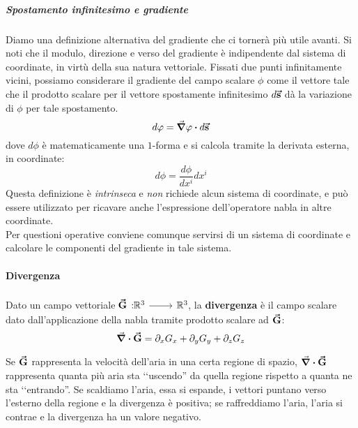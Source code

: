 \subparagraph{Spostamento infinitesimo e gradiente}
Diamo una definizione alternativa del gradiente che ci tornerà più utile avanti. Si noti che il modulo, direzione e verso del gradiente è indipendente dal sistema di coordinate, in virtù della sua natura vettoriale. Fissati due punti infinitamente vicini, possiamo considerare il gradiente del campo scalare $\phi$ come il vettore tale che il prodotto scalare per il vettore spostamente infinitesimo $d\vb*{\va{s}}$ dà la variazione di $\phi$ per tale spostamento.
\begin{equation}
	d\phi=\grad{\phi}\vdot d\vba{s}\label{gradienteintrinseco}
\end{equation}
dove $d\phi$ è matematicamente una $1$-forma e si calcola tramite la derivata esterna, in coordinate:
\begin{equation}
	d\phi=\frac{d\phi}{dx^i}dx^i
\end{equation}
Questa definizione è \textit{intrinseca} e \textit{non} richiede alcun sistema di coordinate, e può essere utilizzato per ricavare anche l'espressione dell'operatore nabla in altre coordinate.\\
Per questioni operative conviene comunque servirsi di un sistema di coordinate e calcolare le componenti del gradiente in tale sistema.
\paragraph{Divergenza}
\begin{define}[Divergenza]
	Dato un campo vettoriale $\funz[\vba{G}]{\realset^3}{\realset^3}$, la \textbf{divergenza} è il campo scalare dato dall'applicazione della nabla tramite prodotto scalare ad $\vb*{\va{G}}$:
	\begin{equation}
		\div{\vb*{\va{G}}}=\partial_xG_x+\partial_yG_y+\partial_zG_z
	\end{equation}
\end{define}
\begin{example}
	Se $\vb*{\va{G}}$ rappresenta la velocità dell'aria in una certa regione di spazio, $\div{ \vb*{\va{G}}}$ rappresenta quanta più aria sta ‘‘uscendo'' da quella regione rispetto a quanta ne sta ‘‘entrando''. Se scaldiamo l'aria, essa si espande, i vettori puntano verso l'esterno della regione e la divergenza è positiva; se raffreddiamo l'aria, l'aria si contrae e la divergenza ha un valore negativo.
\end{example}
